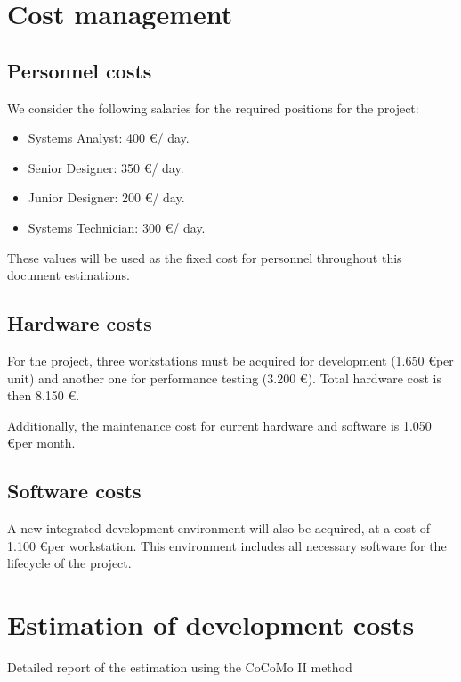 \section{Cost management}

\subsection{Personnel costs}

We consider the following salaries for the required positions for the project:

\begin{itemize}
\item Systems Analyst: 400 \euro / day.
\item Senior Designer: 350 \euro / day.
\item Junior Designer: 200 \euro / day.
\item Systems Technician: 300 \euro / day.
\end{itemize}

These values will be used as the fixed cost for personnel throughout this document estimations.

\subsection{Hardware costs}

For the project, three workstations must be acquired for development (1.650 \euro per unit) and another one for performance testing (3.200 \euro). Total hardware cost is then 8.150 \euro.

Additionally, the maintenance cost for current hardware and software is 1.050 \euro per month.

\subsection{Software costs}

A new integrated development environment will also be acquired, at a cost of 1.100 \euro per workstation. This environment includes all necessary software for the lifecycle of the project.

\section{Estimation of development costs}

\begin{table}[hbtp]
\centering

\caption{Detailed report of the estimation using the CoCoMo II method}
\label{tblCocomoDetail}
\end{table}
